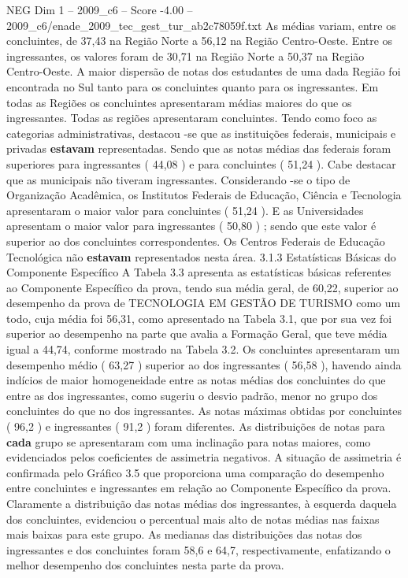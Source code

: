 \begin{textsample}{NEG Dim 1 – 2009\_c6 – Score -4.00 – 2009\_c6/enade\_2009\_tec\_gest\_tur\_ab2c78059f.txt}
As médias variam, entre os concluintes, de 37,43 na Região Norte a 56,12 na Região Centro-Oeste.
Entre os ingressantes, os valores foram de 30,71 na Região Norte a 50,37 na Região Centro-Oeste.
A maior dispersão de notas dos estudantes de uma dada Região foi encontrada no Sul tanto para os concluintes quanto para os ingressantes.
Em todas as Regiões os concluintes apresentaram médias maiores do que os ingressantes.
Todas as regiões apresentaram concluintes.
Tendo como foco as categorias administrativas, destacou -se que as instituições federais, municipais e privadas \textbf{estavam} representadas.
Sendo que as notas médias das federais foram superiores para ingressantes ( 44,08 ) e para concluintes ( 51,24 ).
Cabe destacar que as municipais não tiveram ingressantes.
Considerando -se o tipo de Organização Acadêmica, os Institutos Federais de Educação, Ciência e Tecnologia apresentaram o maior valor para concluintes ( 51,24 ).
E as Universidades apresentam o maior valor para ingressantes ( 50,80 ) ; sendo que este valor é superior ao dos concluintes correspondentes.
Os Centros Federais de Educação Tecnológica não \textbf{estavam} representados nesta área. 3.1.3 Estatísticas Básicas do Componente Específico A Tabela 3.3 apresenta as estatísticas básicas referentes ao Componente Específico da prova, tendo sua média geral, de 60,22, superior ao desempenho da prova de TECNOLOGIA EM GESTÃO DE TURISMO como um todo, cuja média foi 56,31, como apresentado na Tabela 3.1, que por sua vez foi superior ao desempenho na parte que avalia a Formação Geral, que teve média igual a 44,74, conforme mostrado na Tabela 3.2.
Os concluintes apresentaram um desempenho médio ( 63,27 ) superior ao dos ingressantes ( 56,58 ), havendo ainda indícios de maior homogeneidade entre as notas médias dos concluintes do que entre as dos ingressantes, como sugeriu o desvio padrão, menor no grupo dos concluintes do que no dos ingressantes.
As notas máximas obtidas por concluintes ( 96,2 ) e ingressantes ( 91,2 ) foram diferentes.
As distribuições de notas para \textbf{cada} grupo se apresentaram com uma inclinação para notas maiores, como evidenciados pelos coeficientes de assimetria negativos.
A situação de assimetria é confirmada pelo Gráfico 3.5 que proporciona uma comparação do desempenho entre concluintes e ingressantes em relação ao Componente Específico da prova.
Claramente a distribuição das notas médias dos ingressantes, à esquerda daquela dos concluintes, evidenciou o percentual mais alto de notas médias nas faixas mais baixas para este grupo.
As medianas das distribuições das notas dos ingressantes e dos concluintes foram 58,6 e 64,7, respectivamente, enfatizando o melhor desempenho dos concluintes nesta parte da prova.

\end{textsample}
